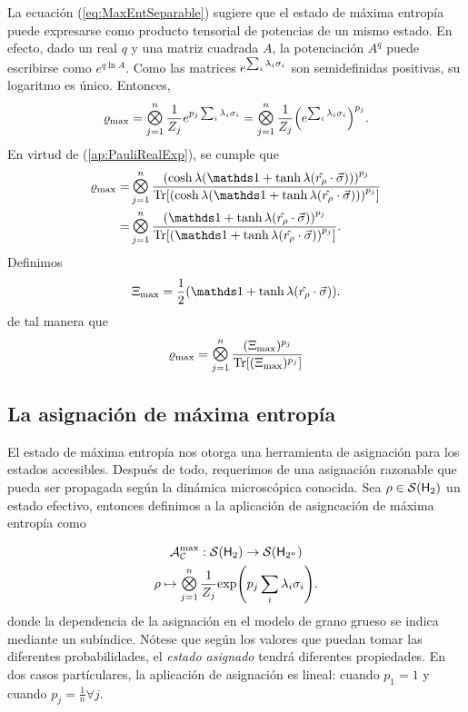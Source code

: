 

La ecuación (\ref{eq:MaxEntSeparable}) sugiere que el estado de máxima entropía puede expresarse como producto tensorial de potencias de un mismo estado. En efecto, dado un real $q$ y una matriz cuadrada $A$, la potenciación $A^{q}$ puede escribirse como $e^{q \ln A}$. Como las matrices $e^{\sum_{i}\lambda_{i}\sigma_{i}}$ son semidefinidas positivas, su logaritmo es único. Entonces,
\begin{equation*}
    \varrho_{\max}=\Motimes_{j=1}^{n}\frac{1}{Z_{j}}e^{p_{j}\sum_{i}\lambda_{i}\pauli{i}}=\Motimes_{j=1}^{n}\frac{1}{Z_{j}}\qty(e^{\sum_{i}\lambda_{i}\pauli{i}})^{p_{j}}.
\end{equation*}
En virtud de (\ref*{ap:PauliRealExp}), se cumple que
\begin{align*}
  \varrho_{\max}=&\Motimes_{j=1}^{n}\frac{\qty(\cosh{\lambda}(\Id+\tanh{\lambda}(\paulivec{r_{\rho}})))^{p_{j}}}{\Tr[\qty(\cosh{\lambda}(\Id+\tanh{\lambda}(\paulivec{r_{\rho}})))^{p_{j}}]}\\
  =&\Motimes_{j=1}^{n}\frac{\qty(\Id+\tanh{\lambda}(\paulivec{r_{\rho}}))^{p_{j}}}{\Tr[\qty(\Id+\tanh{\lambda}(\paulivec{r_{\rho}}))^{p_{j}}]}.
\end{align*}
Definimos
\begin{equation}\label{eq:Xi}
  \Xi_{\max}=\frac{1}{2}(\Id+\tanh{\lambda}(\paulivec{r_{\rho}})).
\end{equation}
de tal manera que 
\begin{equation}\label{eq:MaxEntSeparablePower}
  \varrho_{\max}=\Motimes_{j=1}^{n}\frac{(\Xi_{\max})^{p_{j}}}{\Tr[ (\Xi_{\max})^{p_{j}}]}
\end{equation}

\subsection{La asignación de máxima entropía}

El estado de máxima entropía nos otorga una herramienta de asignación para los estados accesibles. Después de todo, requerimos de una asignación razonable que pueda ser propagada según la dinámica microscópica conocida. Sea $\rho\in\mathcal{S}({\sf H}_{2})$ un estado efectivo, entonces definimos a la aplicación de asigncación de máxima entropía como

\begin{gather}\label{eq:MaxEntAss}
    \mcA_{\mcC}^{\max}:\densityspace{2}\rightarrow\densityspace{2^{n}}\nonumber\\
    \rho \mapsto \Motimes_{j=1}^{n}\frac{1}{Z_{j}}\text{exp}\qty(p_{j}\sum_{i}\lambda_{i}\sigma_{i}).
\end{gather}
donde la dependencia de la asignación en el modelo de grano grueso se indica mediante un subíndice. Nótese que según los valores que puedan tomar las diferentes probabilidades, el \textit{estado asignado} tendrá diferentes propiedades. En dos casos partículares, la aplicación de asignación es lineal: cuando $p_{1}=1$ y cuando $p_{j}=\frac{1}{n}\forall j$.

